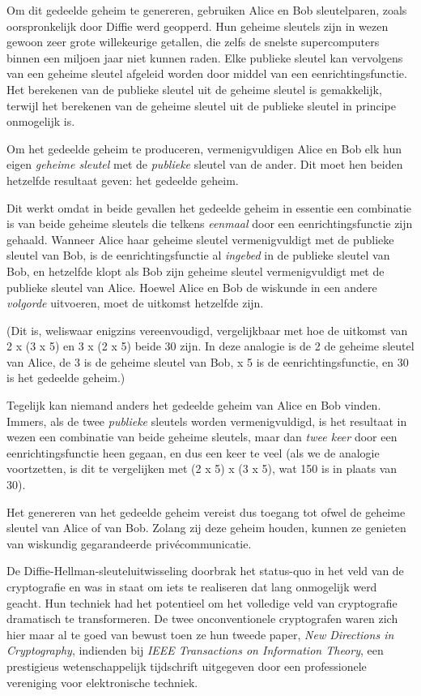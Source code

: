 \documentclass[
  a5paper,
  smalldemyvopaper,11pt,twoside,onecolumn,openright,extrafontsizes,
hidelinks]{memoir}
\begin{document}
Om dit gedeelde geheim te genereren, gebruiken Alice en Bob
sleutelparen, zoals oorspronkelijk door Diffie werd geopperd. Hun
geheime sleutels zijn in wezen gewoon zeer grote willekeurige getallen,
die zelfs de snelste supercomputers binnen een miljoen jaar niet kunnen
raden. Elke publieke sleutel kan vervolgens van een geheime sleutel
afgeleid worden door middel van een eenrichtingsfunctie. Het berekenen
van de publieke sleutel uit de geheime sleutel is gemakkelijk, terwijl
het berekenen van de geheime sleutel uit de publieke sleutel in principe
onmogelijk is.

Om het gedeelde geheim te produceren, vermenigvuldigen Alice en Bob elk
hun eigen \emph{geheime sleutel} met de \emph{publieke} sleutel van de
ander. Dit moet hen beiden hetzelfde resultaat geven: het gedeelde
geheim.

Dit werkt omdat in beide gevallen het gedeelde geheim in essentie een
combinatie is van beide geheime sleutels die telkens \emph{eenmaal} door
een eenrichtingsfunctie zijn gehaald. Wanneer Alice haar geheime sleutel
vermenigvuldigt met de publieke sleutel van Bob, is de
eenrichtingsfunctie al \emph{ingebed} in de publieke sleutel van Bob, en
hetzelfde klopt als Bob zijn geheime sleutel vermenigvuldigt met de
publieke sleutel van Alice. Hoewel Alice en Bob de wiskunde in een
andere \emph{volgorde} uitvoeren, moet de uitkomst hetzelfde zijn.

(Dit is, weliswaar enigzins vereenvoudigd, vergelijkbaar met hoe de
uitkomst van 2 x (3 x 5) en 3 x (2 x 5) beide 30 zijn. In deze analogie
is de 2 de geheime sleutel van Alice, de 3 is de geheime sleutel van
Bob, x 5 is de eenrichtingsfunctie, en 30 is het gedeelde geheim.)

Tegelijk kan niemand anders het gedeelde geheim van Alice en Bob vinden.
Immers, als de twee \emph{publieke} sleutels worden vermenigvuldigd, is
het resultaat in wezen een combinatie van beide geheime sleutels, maar
dan \emph{twee keer} door een eenrichtingsfunctie heen gegaan, en dus
een keer te veel (als we de analogie voortzetten, is dit te vergelijken
met (2 x 5) x (3 x 5), wat 150 is in plaats van 30).

Het genereren van het gedeelde geheim vereist dus toegang tot ofwel de
geheime sleutel van Alice of van Bob. Zolang zij deze geheim houden,
kunnen ze genieten van wiskundig gegarandeerde privécommunicatie.

De Diffie-Hellman-sleuteluitwisseling doorbrak het status-quo in het
veld van de cryptografie en was in staat om iets te realiseren dat lang
onmogelijk werd geacht. Hun techniek had het potentieel om het volledige
veld van cryptografie dramatisch te transformeren. De twee
onconventionele cryptografen waren zich hier maar al te goed van bewust
toen ze hun tweede paper, \emph{New Directions in Cryptography},
indienden bij \emph{IEEE Transactions on Information Theory}, een
prestigieus wetenschappelijk tijdschrift uitgegeven door een
professionele vereniging voor elektronische techniek.
\end{document}
